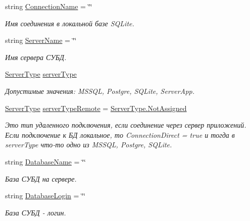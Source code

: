 \begin{DoxyCompactItemize}
string \mbox{\hyperlink{class_f_b_a_1_1_connection_aae6e7e372a0df905fdbe5ae1844d3279}{Connection\+Name}} = \char`\"{}\char`\"{}
\begin{DoxyCompactList}\small\item\em Имя соединения в локальной базе S\+Q\+Lite. ~\newline
\end{DoxyCompactList}\item 
string \mbox{\hyperlink{class_f_b_a_1_1_connection_a6a04e4e09b3be5fc37491234ccf46a61}{Server\+Name}} = \char`\"{}\char`\"{}
\begin{DoxyCompactList}\small\item\em Имя сервера СУБД. \end{DoxyCompactList}\item 
\mbox{\hyperlink{namespace_f_b_a_a54b34d51226fe01d01f79d9fcb237413}{Server\+Type}} \mbox{\hyperlink{class_f_b_a_1_1_connection_ad5c6e7969020c242db56e1910c6e353f}{server\+Type}}
\begin{DoxyCompactList}\small\item\em Допустимые значения\+: M\+S\+S\+QL, Postgre, S\+Q\+Lite, Server\+App. \end{DoxyCompactList}\item 
\mbox{\hyperlink{namespace_f_b_a_a54b34d51226fe01d01f79d9fcb237413}{Server\+Type}} \mbox{\hyperlink{class_f_b_a_1_1_connection_ada46cb57e3fc2bea5b69c026d2eba248}{server\+Type\+Remote}} = \mbox{\hyperlink{namespace_f_b_a_a54b34d51226fe01d01f79d9fcb237413a316d54b418d9a7186f9234f08cfb599f}{Server\+Type.\+Not\+Assigned}}
\begin{DoxyCompactList}\small\item\em Это тип удаленного подключения, если соединение через сервер приложений. Если подключение к БД локальное, то Connection\+Direct = true и тогда в server\+Type что-\/то одно из M\+S\+S\+QL, Postgre, S\+Q\+Lite. \end{DoxyCompactList}\item 
string \mbox{\hyperlink{class_f_b_a_1_1_connection_a7af426539c14090db733c18b37cfc1f5}{Database\+Name}} = \char`\"{}\char`\"{}
\begin{DoxyCompactList}\small\item\em База СУБД на сервере. \end{DoxyCompactList}\item 
string \mbox{\hyperlink{class_f_b_a_1_1_connection_aa20952e5caba14009de078611bffc06e}{Database\+Login}} = \char`\"{}\char`\"{}
\begin{DoxyCompactList}\small\item\em База СУБД -\/ логин. \end{DoxyCompactList}\item 

\end{DoxyCompactItemize}
